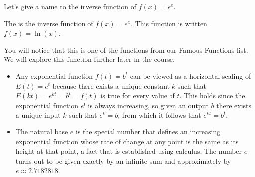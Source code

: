 \documentclass[nooutcomes]{ximera}
\begin{document}
Let's give a name to the inverse function of $f(x)=e^x$.

\begin{definition}
The  is the inverse function of $f(x)=e^x$.  This function is written $f(x)=\ln(x)$.
\end{definition}

You will notice that this is one of the functions from our Famous Functions list.  We will explore this function further later in the course.

\begin{summary}\begin{itemize}
\item Any exponential function $f(t) = b^t$ can be viewed as a horizontal scaling of $E(t) = e^t$ because there exists a unique constant $k$ such that $E(kt) = e^{kt} = b^t = f(t)$ is true for every value of $t$.  This holds since the exponential function $e^t$ is always increasing, so given an output $b$ there exists a unique input $k$ such that $e^k = b$, from which it follows that $e^{kt} = b^t$.
\item The natural base $e$ is the special number that defines an increasing exponential function whose rate of change at any point is the same as its height at that point, a fact that is established using calculus.  The number $e$ turns out to be given exactly by an infinite sum and approximately by $e \approx 2.7182818$.
\end{itemize}\end{summary}
\end{document}
